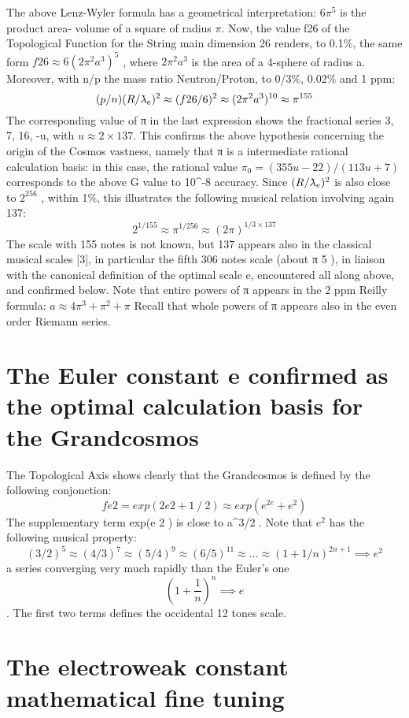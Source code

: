 The above Lenz-Wyler formula has a geometrical interpretation: $6\pi^{5}$ is the product area-
volume of a square of radius $\pi$. Now, the value f{26} of the Topological Function for the String
main dimension 26 renders, to 0.1\%, the same form $f{26} \approx 6(2\pi^{2} a^{3} )^{5}$ , where $2\pi^{2}a^{3}$ is the area of a
4-sphere of radius a. Moreover, with n/p the mass ratio Neutron/Proton, to 0/3\%, 0.02\% and 1
ppm:
$$(p/n) (R/\lambdabar_{e})^{2} \approx (f{26}/6)^{2} \approx (2\pi^{2} a^{3})^{10} \approx \pi^{155}$$
The corresponding value of π in the last expression shows the fractional series 3, 7, 16, -u, with $u \approx
2 \times 137$. This confirms the above hypothesis concerning the origin of the Cosmos vastness, namely
that π is a intermediate rational calculation basis: in this case, the rational value $\pi_{0} = (355u-22)/
(113u+7)$ corresponds to the above G value to 10^{-8} accuracy.
Since $(R/\lambdabar_e )^{2}$ is also close to $2^{256}$ , within 1\%, this illustrates the following musical relation
involving again 137:
$$2^{1/155} \approx \pi^{1/256} \approx (2\pi)^{1/3 \times 137}$$
The scale with 155 notes is not known, but 137 appears also in the classical musical scales [3], in
particular the fifth 306 notes scale (about π 5 ), in liaison with the canonical definition of the optimal
scale e, encountered all along above, and confirmed below.
Note that entire powers of π appears in the 2 ppm Reilly formula: $a \approx 4\pi^{3} + \pi^{2} + \pi$
Recall that whole powers of π appears also in the even order Riemann series.

\section {The Euler constant e confirmed as the optimal calculation basis for the Grandcosmos}

The Topological Axis shows clearly that the Grandcosmos is defined by the following
conjonction:
$$f{e 2 } = exp(2 e2 + 1⁄2 ) \approx exp(e^{2e} + e^{2} )$$
The supplementary term exp(e 2 ) is close to a^{3/2} . Note that $e^{2}$ has the following musical property:
$$(3/2)^{5} \approx (4/3)^{7} \approx (5/4)^{9} \approx (6/5)^{11} \approx ... \approx (1+1/n)^{2n+1} \implies e^{2}$$
a series converging very much rapidly than the Euler's one $$(1+\frac{1}{n})^{n} \implies e$$. The first two terms defines
the occidental 12 tones scale.

\section {The electroweak constant mathematical fine tuning}

